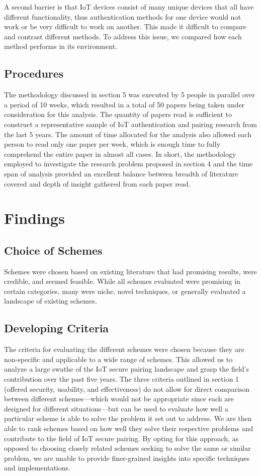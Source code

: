 \documentclass[10pt,twocolumn,letterpaper]{article}
\begin{document}
A second barrier is that IoT devices consist of many unique devices that all have different functionality, thus authentication methods for one device would not work or be very difficult to work on another. This made it difficult to compare and contrast different methods. To address this issue, we compared how each method performs in its environment.

\subsection{Procedures}

The methodology discussed in section 5 was executed by 5 people in parallel over a period of 10 weeks, which resulted in a total of 50 papers being taken under consideration for this analysis. The quantity of papers read is sufficient to construct a representative sample of IoT authentication and pairing research from the last 5 years. The amount of time allocated for the analysis also allowed each person to read only one paper per week, which is enough time to fully comprehend the entire paper in almost all cases. In short, the methodology employed to investigate the research problem proposed in section 4 and the time span of analysis provided an excellent balance between breadth of literature covered and depth of insight gathered from each paper read.

\section{Findings}

\subsection{Choice of Schemes}
Schemes were chosen based on existing literature that had promising results, were credible, and seemed feasible. While all schemes evaluated were promising in certain categories, many were niche, novel techniques, or generally evaluated a landscape of existing schemes.

\subsection{Developing Criteria}
The criteria for evaluating the different schemes were chosen because they are non-specific and applicable to a wide range of schemes. This allowed us to analyze a large swathe of the IoT secure pairing landscape and grasp the field’s contribution over the past five years. The three criteria outlined in section 1 (offered security, usability, and effectiveness) do not allow for direct comparison between different schemes—which would not be appropriate since each are designed for different situations—but can be used to evaluate how well a particular scheme is able to solve the problem it set out to address. We are then able to rank schemes based on how well they solve their respective problems and contribute to the field of IoT secure pairing. By opting for this approach, as opposed to choosing closely related schemes seeking to solve the same or similar problem, we are unable to provide finer-grained insights into specific techniques and implementations.
\end{document}
